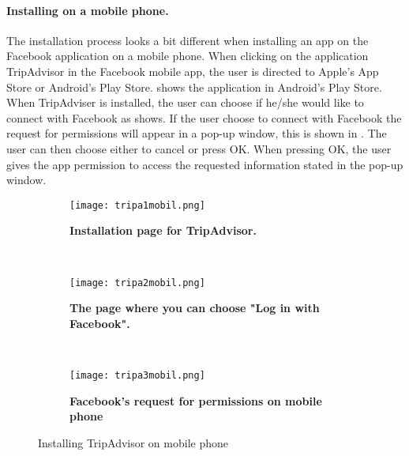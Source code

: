 \paragraph{Installing on a mobile phone.}
The installation process looks a bit different when installing an app on the Facebook application on a mobile phone. When clicking on the application TripAdvisor in the Facebook mobile app, the user is directed to Apple's App Store or Android's Play Store.  shows the application in Android's Play Store. When TripAdviser is installed, the user can choose if he/she would like to connect with Facebook as  shows. If the user choose to connect with Facebook the request for permissions will appear in a pop-up window, this is shown in . The user can then choose either to cancel or press OK. When pressing OK, the user gives the app permission to access the requested information stated in the pop-up window. 

\begin{figure}
        \centering
        \begin{subfigure}[t]{0.3\textwidth}
                \texttt{[image: tripa1mobil.png]}
                \caption[Installation page for TripAdvisor]{\textbf{Installation 				page for TripAdvisor.}} 
                \label{fig:tripa1mobil}
        \end{subfigure}%
        ~ %
        \begin{subfigure}[t]{0.3\textwidth}
                \texttt{[image: tripa2mobil.png]}
               \caption[The page where you choose "Log in with Facebook"]							{\textbf{The page where you can choose "Log in with Facebook".}} 
                \label{fig:tripa2mobil}
        \end{subfigure}
        ~ %
        \begin{subfigure}[t]{0.3\textwidth}
                \texttt{[image: tripa3mobil.png]}
                \caption[Facebook's request for permissions on mobile phone]						{\textbf{Facebook's request for permissions on mobile phone}} 
                \label{fig:tripa3mobil}
        \end{subfigure}
        \caption{Installing TripAdvisor on mobile phone}\label{fig:mobileinstallation}
\end{figure}

